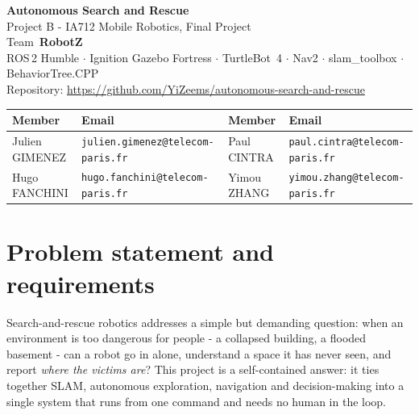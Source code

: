 \documentclass[11pt,a4paper]{article}
\begin{document}
\sloppy

\begin{center}
  {\LARGE\bfseries\color{nccblue} Autonomous Search and Rescue}\\[2pt]
  {\large Project B - IA712 Mobile Robotics, Final Project}\\[3pt]
  {\normalsize Team~\textbf{RobotZ}}\\[4pt]
  {\small ROS\,2 Humble $\cdot$ Ignition Gazebo Fortress $\cdot$ TurtleBot~4 $\cdot$ Nav2 $\cdot$ slam\_toolbox $\cdot$ BehaviorTree.CPP}\\[4pt]
  {\footnotesize Repository: \url{https://github.com/YiZeems/autonomous-search-and-rescue}}
\end{center}

\vspace{-2pt}
{\footnotesize
\begin{center}
\begin{tabular}{@{}llll@{}}
\toprule
\textbf{Member} & \textbf{Email} & \textbf{Member} & \textbf{Email}\\
\midrule
Julien GIMENEZ & \texttt{julien.gimenez@telecom-paris.fr} & Paul CINTRA & \texttt{paul.cintra@telecom-paris.fr}\\
Hugo FANCHINI  & \texttt{hugo.fanchini@telecom-paris.fr}  & Yimou ZHANG & \texttt{yimou.zhang@telecom-paris.fr}\\
\bottomrule
\end{tabular}
\end{center}}

\noindent{}

\section{Problem statement and requirements}
Search-and-rescue robotics addresses a simple but demanding question: when an environment is too
dangerous for people - a collapsed building, a flooded basement - can a robot go in alone, understand a
space it has never seen, and report \emph{where the victims are}? This project is a self-contained answer:
it ties together SLAM, autonomous exploration, navigation and decision-making into a single system that
runs from one command and needs no human in the loop.
\end{document}

